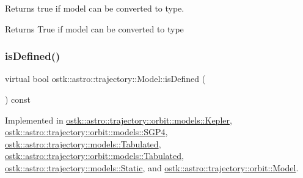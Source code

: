 Returns true if model can be converted to type. 

\begin{DoxyReturn}{Returns}
True if model can be converted to type 
\end{DoxyReturn}
\mbox{\label{classostk_1_1astro_1_1trajectory_1_1_model_a0d5cf6f754905f06c0ec1e39618c20a1}} 
\subsubsection{\texorpdfstring{is\+Defined()}{isDefined()}}
{\footnotesize\ttfamily virtual bool ostk\+::astro\+::trajectory\+::\+Model\+::is\+Defined (\begin{DoxyParamCaption}{ }\end{DoxyParamCaption}) const\hspace{0.3cm}{\ttfamily [pure virtual]}}



Implemented in \hyperlink{classostk_1_1astro_1_1trajectory_1_1orbit_1_1models_1_1_kepler_a4c74402d5483a51e5e0fe1920cd52ec4}{ostk\+::astro\+::trajectory\+::orbit\+::models\+::\+Kepler}, \hyperlink{classostk_1_1astro_1_1trajectory_1_1orbit_1_1models_1_1_s_g_p4_ab18e0666588bd517c190942b1a54ed18}{ostk\+::astro\+::trajectory\+::orbit\+::models\+::\+S\+G\+P4}, \hyperlink{classostk_1_1astro_1_1trajectory_1_1models_1_1_tabulated_a379da4c10a738c3f4578042c9bae0c91}{ostk\+::astro\+::trajectory\+::models\+::\+Tabulated}, \hyperlink{classostk_1_1astro_1_1trajectory_1_1orbit_1_1models_1_1_tabulated_ad114ba4762b54211f74f0aa3ac5eedae}{ostk\+::astro\+::trajectory\+::orbit\+::models\+::\+Tabulated}, \hyperlink{classostk_1_1astro_1_1trajectory_1_1models_1_1_static_a5a80d75c9215af9b198c9f8653c5bc17}{ostk\+::astro\+::trajectory\+::models\+::\+Static}, and \hyperlink{classostk_1_1astro_1_1trajectory_1_1orbit_1_1_model_a13c5b5693dd86a072da0bd0e319bacc2}{ostk\+::astro\+::trajectory\+::orbit\+::\+Model}.

\mbox{\label{classostk_1_1astro_1_1trajectory_1_1_model_a2dd77b9f6939d738f3a489f26c955340}} 

